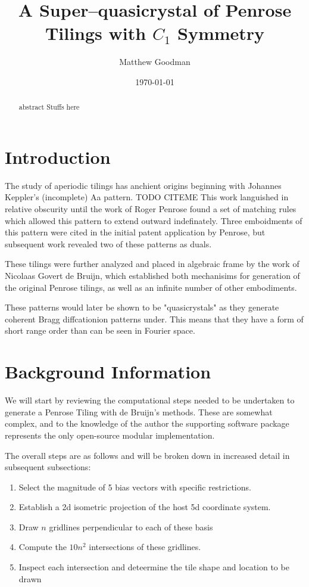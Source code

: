 \documentclass{amsart}
\begin{document}
\title{A Super--quasicrystal of Penrose Tilings with $C_1$ Symmetry}
\author[MR Goodman]{Matthew Goodman}
\address{3Scan \\ 2122 Bryant \\ San Francisco CA, 94110}

\date{\today}

\begin{abstract}
	abstract Stuffs here
\end{abstract}

\maketitle

\section{Introduction}
The study of aperiodic tilings has anchient origins beginning with Johannes Keppler's (incomplete) Aa
pattern. TODO CITEME  This work languished in relative obscurity until the work of Roger Penrose\cite{penrose1979pentaplexity}
found a set of matching rules which allowed this pattern to extend outward 
indefinately. Three emboidments of this pattern were cited in the initial patent application by Penrose\cite{penrose1979set},
but subsequent work revealed two of these patterns as duals.

These tilings were further analyzed and placed in algebraic frame by the work of 
Nicolaas Govert de Bruijn, which established both mechanisims for generation of the 
original Penrose tilings, as well as an infinite number of other embodiments.\cite{de1981algebraic1, de1981algebraic2}

These patterns would later be shown to be "quasicrystals" as they generate coherent Bragg 
diffcationion patterns under.  This means that they have a form of short range order than can
be seen in Fourier space.\cite{de1986quasicrystals} 

\section{Background Information}
We will start by reviewing the computational steps needed to be undertaken to generate a Penrose Tiling
with de Bruijn's methods.  These are somewhat complex, and to the knowledge of the author the supporting
software package represents the only open-source modular implementation.

The overall steps are as follows and will be broken down in increased detail in subsequent subsections:
\begin{enumerate}
  \item Select the magnitude of 5 bias vectors with specific restrictions.
  \item Establish a 2d isometric projection of the host 5d coordinate system.
  \item Draw $n$ gridlines perpendicular to each of these basis
  \item Compute the $10n^2$ intersections of these gridlines.
  \item Inspect each intersection and deteermine the tile shape and location to be drawn
\end{enumerate}
\end{document}
